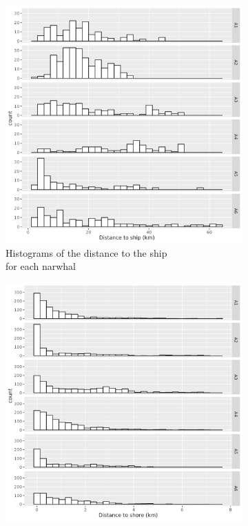 \documentclass[11pt]{article}
\newcommand {\1}{\mathbb{1}}
\begin{document}
\begin{figure}[H]
    \centering
    \begin{subfigure}{0.48\textwidth}
    \centering
     \includegraphics[scale=0.45]{images/data_exploration/Dship_histo.png}
    \caption{Histograms of the distance to the ship \\ for each narwhal}
    \end{subfigure}
    \begin{subfigure}{0.48\textwidth}
    \centering
    \includegraphics[scale=0.45]{images/data_exploration/Dshore_histo.png}

\end{subfigure}
\end{figure}
\end{document}
